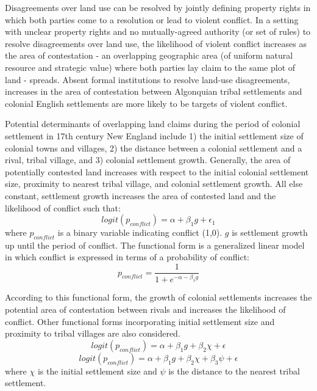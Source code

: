 \documentclass[sn-mathphys]{sn-jnl}%
\theoremstyle{thmstyleone}%
\theoremstyle{thmstyletwo}%
\theoremstyle{thmstylethree}%
\begin{document}
Disagreements over land use can be resolved by jointly defining property rights in which both parties come to a resolution or lead to violent conflict. In a setting with unclear property rights and no mutually-agreed authority (or set of rules) to resolve disagreements over land use, the likelihood of violent conflict increases as the area of contestation - an overlapping geographic area (of uniform natural resource and strategic value) where both parties lay claim to the same plot of land - spreads. Absent formal institutions to resolve land-use disagreements, increases in the area of contestation between Algonquian tribal settlements and colonial English settlements are more likely to be targets of violent conflict.

Potential determinants of overlapping land claims during the period of colonial settlement in 17th century New England include 1) the initial settlement size of colonial towns and villages, 2) the distance between a colonial settlement and a rival, tribal village, and 3) colonial settlement growth. Generally, the area of potentially contested land increases with respect to the initial colonial settlement size, proximity to nearest tribal village, and colonial settlement growth. All else constant, settlement growth increases the area of contested land and the likelihood of conflict such that: 
\begin{equation}
logit(p_{conflict})= \alpha + \beta_{1}g + \epsilon_{1} 
\end{equation}
where $p_{conflict}$ is a binary variable indicating conflict (1,0). $g$ is settlement growth up until the period of conflict. The functional form is a generalized linear model in which conflict is expressed in terms of a probability of conflict:
$$
p_{conflict}=\frac{1}{1+e^{-\alpha-\beta_{1}g}}
$$

According to this functional form, the growth of colonial settlements increases the potential area of contestation between rivals and increases the likelihood of conflict. Other functional forms incorporating initial settlement size and proximity to tribal villages are also considered.
\begin{equation}
logit(p_{conflict})= \alpha + \beta_{1}g + \beta_{2}\chi + \epsilon
\end{equation}
\begin{equation}
logit(p_{conflict})= \alpha + \beta_{1}g + \beta_{2}\chi + \beta_{3}\psi + \epsilon
\end{equation}
where $\chi$ is the initial settlement size and $\psi$ is the distance to the nearest tribal settlement. 
\end{document}
